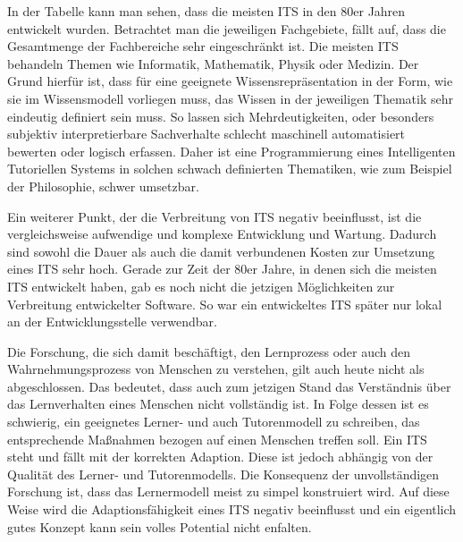 In der Tabelle kann man sehen, dass die meisten ITS in den 80er Jahren entwickelt wurden.
Betrachtet man die jeweiligen Fachgebiete, fällt auf, dass die Gesamtmenge der Fachbereiche
sehr eingeschränkt ist. Die meisten ITS behandeln Themen wie Informatik, Mathematik, Physik
oder Medizin. Der Grund hierfür ist, dass für eine geeignete Wissensrepräsentation in der Form,
wie sie im Wissensmodell vorliegen muss, das Wissen in der jeweiligen Thematik sehr eindeutig
definiert sein muss. So lassen sich Mehrdeutigkeiten, oder besonders subjektiv interpretierbare
Sachverhalte schlecht maschinell automatisiert bewerten oder logisch erfassen. Daher ist eine Programmierung
eines Intelligenten Tutoriellen Systems in solchen schwach definierten Thematiken, wie zum Beispiel
der Philosophie, schwer umsetzbar.

Ein weiterer Punkt, der die Verbreitung von ITS negativ beeinflusst, ist die vergleichsweise
aufwendige und komplexe Entwicklung und Wartung. Dadurch sind sowohl die Dauer als auch die
damit verbundenen Kosten zur Umsetzung eines ITS sehr hoch. Gerade zur Zeit der 80er Jahre,
in denen sich die meisten ITS entwickelt haben, gab es noch nicht die jetzigen Möglichkeiten zur
Verbreitung entwickelter Software. So war ein entwickeltes ITS später nur lokal an der Entwicklungsstelle
verwendbar.

Die Forschung, die sich damit beschäftigt, den Lernprozess oder auch den Wahrnehmungsprozess von
Menschen zu verstehen, gilt auch heute nicht als abgeschlossen. Das bedeutet, dass auch zum jetzigen Stand
das Verständnis über das Lernverhalten eines Menschen nicht vollständig ist.
In Folge dessen ist es schwierig, ein geeignetes Lerner- und auch Tutorenmodell zu schreiben,
das entsprechende Maßnahmen bezogen auf einen Menschen treffen soll. Ein ITS steht und fällt mit der
korrekten Adaption. Diese ist jedoch abhängig von der Qualität des Lerner- und Tutorenmodells.
Die Konsequenz der unvollständigen Forschung ist, dass das Lernermodell meist zu simpel konstruiert wird.
Auf diese Weise wird die Adaptionsfähigkeit eines ITS negativ beeinflusst und ein eigentlich gutes Konzept
kann sein volles Potential nicht enfalten.

